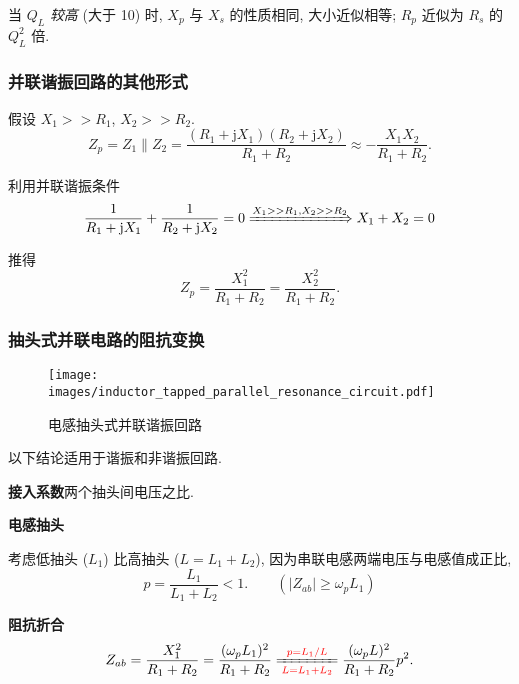 当 $Q_L$ \textit{较高} (大于 10) 时, $X_p$ 与 $X_s$ 的性质相同, 大小近似相等; $R_p$ 近似为 $R_s$ 的 $Q_L^2$ 倍.

\subsubsection{并联谐振回路的其他形式}

假设 $X_1>>R_1$, $X_2>>R_2$.
\begin{equation}
    Z_p=Z_1\parallel Z_2=\frac{(R_1+\mathrm{j}X_1)(R_2+\mathrm{j}X_2)}{R_1+R_2}\approx-\frac{X_1X_2}{R_1+R_2}.
\end{equation}

利用并联谐振条件
\begin{equation} \label{eq:2.3 并联谐振条件}
    \frac{1}{R_1+\mathrm{j}X_1}+\frac{1}{R_2+\mathrm{j}X_2}=0 \xRightarrow{X_1>>R_1,X_2>>R_2} X_1+X_2=0
\end{equation}

\noindent 推得
\begin{equation}
    Z_p=\frac{X_1^2}{R_1+R_2}=\frac{X_2^2}{R_1+R_2}.
\end{equation}

\subsubsection{抽头式并联电路的阻抗变换}

\begin{wrapfigure}{r}{.38\textwidth}
    \centering
    \texttt{[image: images/inductor\_tapped\_parallel\_resonance\_circuit.pdf]}
    \caption{电感抽头式并联谐振回路}
\end{wrapfigure}

以下结论适用于谐振和非谐振回路.

\textbf{接入系数}\quad 两个抽头间电压之比.

\textbf{电感抽头}

考虑低抽头 ($L_1$) 比高抽头 ($L=L_1+L_2$), 因为串联电感两端电压与电感值成正比,
\begin{equation}
    p=\frac{L_1}{L_1+L_2}<1. \qquad (|Z_{ab}|\geq\omega_pL_1)
\end{equation}

\textbf{阻抗折合}
\begin{equation}
    Z_{ab}=\frac{X_1^2}{R_1+R_2}=\frac{(\omega_p L_1)^2}{R_1+R_2}\xlongequal[{\color{red} L=L_1+L_2}]{{\color{red} p=L_1/L}}\frac{(\omega_p L)^2}{R_1+R_2}p^2.
\end{equation}

